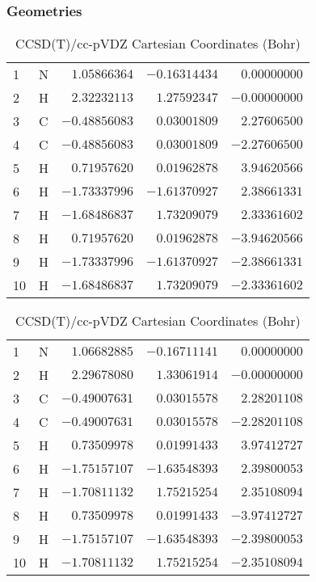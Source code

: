 \documentclass[10pt,oneside]{article}
\begin{document}
\clearpage

\subsection{}

\begin{table}[h!]
\subsubsection*{Geometries}
\begin{multicols}{2}
\centering
\caption{CCSD(T)/cc-pVTZ Cartesian Coordinates (Bohr)}
\begin{tabular}{llrrr}
\toprule
1  & N  & $ 1.05866364$ & $-0.16314434$ & $ 0.00000000$ \\
2  & H  & $ 2.32232113$ & $ 1.27592347$ & $-0.00000000$ \\
3  & C  & $-0.48856083$ & $ 0.03001809$ & $ 2.27606500$ \\
4  & C  & $-0.48856083$ & $ 0.03001809$ & $-2.27606500$ \\
5  & H  & $ 0.71957620$ & $ 0.01962878$ & $ 3.94620566$ \\
6  & H  & $-1.73337996$ & $-1.61370927$ & $ 2.38661331$ \\
7  & H  & $-1.68486837$ & $ 1.73209079$ & $ 2.33361602$ \\
8  & H  & $ 0.71957620$ & $ 0.01962878$ & $-3.94620566$ \\
9  & H  & $-1.73337996$ & $-1.61370927$ & $-2.38661331$ \\
10 & H  & $-1.68486837$ & $ 1.73209079$ & $-2.33361602$ \\
\bottomrule
\end{tabular}
\caption{CCSD(T)/cc-pVDZ Cartesian Coordinates (Bohr)}
\begin{tabular}{llrrr}
\toprule
1  & N  & $ 1.06682885$ & $-0.16711141$ & $ 0.00000000$ \\
2  & H  & $ 2.29678080$ & $ 1.33061914$ & $-0.00000000$ \\
3  & C  & $-0.49007631$ & $ 0.03015578$ & $ 2.28201108$ \\
4  & C  & $-0.49007631$ & $ 0.03015578$ & $-2.28201108$ \\
5  & H  & $ 0.73509978$ & $ 0.01991433$ & $ 3.97412727$ \\
6  & H  & $-1.75157107$ & $-1.63548393$ & $ 2.39800053$ \\
7  & H  & $-1.70811132$ & $ 1.75215254$ & $ 2.35108094$ \\
8  & H  & $ 0.73509978$ & $ 0.01991433$ & $-3.97412727$ \\
9  & H  & $-1.75157107$ & $-1.63548393$ & $-2.39800053$ \\
10 & H  & $-1.70811132$ & $ 1.75215254$ & $-2.35108094$ \\
\bottomrule
\end{tabular}
\end{multicols}
\end{table}
\end{document}
